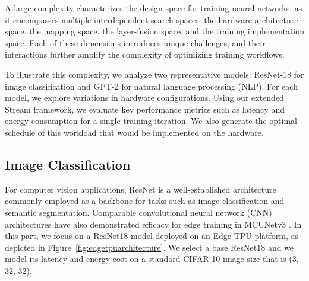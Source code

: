 \documentclass[lettersize,journal]{IEEEtran}
\begin{document}
A large complexity characterizes the design space for training neural networks, as it encompasses multiple interdependent search spaces: the hardware architecture space, the mapping space, the layer-fusion space, and the training implementation space. Each of these dimensions introduces unique challenges, and their interactions further amplify the complexity of optimizing training workflows.

To illustrate this complexity, we analyze two representative models: ResNet-18 for image classification and GPT-2 for natural language processing (NLP). For each model, we explore variations in hardware configurations. Using our extended Stream framework, we evaluate key performance metrics such as latency and energy consumption for a single training iteration. We also generate the optimal schedule of this workload that would be implemented on the hardware. 

\subsection{Image Classification}\label{pag:resnet18}
For computer vision applications, ResNet is a well-established architecture commonly employed as a backbone for tasks such as image classification and semantic segmentation. Comparable convolutional neural network (CNN) architectures have also demonstrated efficacy for edge training in MCUNetv3 \cite{lin2022device}. 
In this part, we focus on a ResNet18 model deployed on an Edge TPU platform, as depicted in Figure~\ref{fig:edgetpuarchitecture}. We select a base ResNet18 and we model its latency and energy cost on a standard CIFAR-10 image size that is (3, 32, 32).
\end{document}
